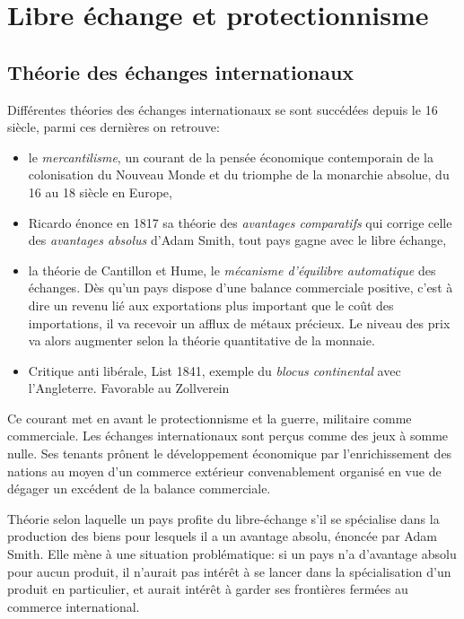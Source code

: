 \documentclass[main.tex]{subfiles}
\begin{document}
\chapter{Libre échange et protectionnisme}

\section{Théorie des échanges internationaux}
Différentes théories des échanges internationaux se sont succédées depuis le 16 siècle, parmi ces dernières on retrouve:
        \begin{itemize}
                \item le \emph{mercantilisme}, un courant de la pensée économique contemporain de la colonisation du Nouveau Monde et du triomphe de la monarchie absolue, du 16 au 18 siècle en Europe, 
                \item Ricardo énonce en 1817 sa théorie des \emph{avantages comparatifs} qui corrige celle des \emph{avantages absolus} d’Adam Smith, tout pays gagne avec le libre échange,
                \item la théorie de Cantillon et Hume, le \emph{mécanisme d'équilibre automatique} des échanges. Dès qu'un pays dispose d'une balance commerciale positive, c'est à dire un revenu lié aux exportations plus important que le coût des importations, il va recevoir un afflux de métaux précieux. Le niveau des prix va alors augmenter selon la théorie quantitative de la monnaie. 
                \item Critique anti libérale, List 1841, exemple du \emph{blocus continental} avec l'Angleterre. Favorable au Zollverein
        \end{itemize}

        \begin{definition}[Mercantillisme]
                Ce courant met en avant le protectionnisme et la guerre, militaire comme commerciale. Les échanges internationaux sont perçus comme des jeux à somme nulle.
                Ses tenants prônent le développement économique par l'enrichissement des nations au moyen d'un commerce extérieur convenablement organisé en vue de dégager un excédent de la balance commerciale.
        \end{definition}

        \begin{definition}
                Théorie selon laquelle un pays profite du libre-échange s’il se spécialise dans la production des biens pour lesquels il a un avantage absolu, énoncée par Adam Smith. Elle mène à une situation problématique: si un pays n’a d’avantage absolu pour aucun produit, il n’aurait pas intérêt à se lancer dans la spécialisation d’un produit en particulier, et aurait intérêt à garder ses frontières fermées au commerce international.
        \end{definition}
\end{document}
